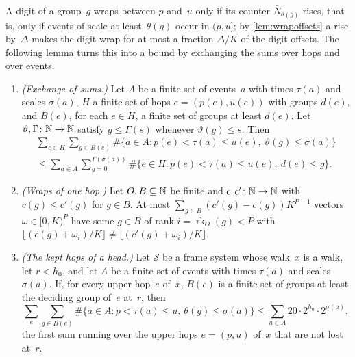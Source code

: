 A digit of a group~$g$ wraps between $p$ and~$u$ only if its counter $\bar N_{\theta(g)}$ rises, that is, only if events of scale at
least~$\theta(g)$ occur in $(p,u]$; by \cref{lem:wrapoffsets} a rise by~$\Delta$ makes the digit wrap for at most a fraction
$\Delta/K$ of the digit offsets. The following lemma turns this into a bound by exchanging the sums over hops and over events.

\begin{lemma}[Wraps]\label{lem:wraps}
\begin{enumerate}[label=(\alph*)]
\item \emph{(Exchange of sums.)} Let $A$ be a finite set of events~$a$ with times $\tau(a)$ and scales $\sigma(a)$, $H$ a finite set of
hops $e=(p(e),u(e))$ with groups $d(e)$, and $B(e)$, for each $e\in H$, a finite set of groups at least $d(e)$. Let
$\vartheta,\Gamma\colon\mathbb{N}\to\mathbb{N}$ satisfy $g\le\Gamma(s)$ whenever $\vartheta(g)\le s$. Then
\begin{multline*}
  \sum_{e\in H}\sum_{g\in B(e)}\#\{a\in A:p(e)<\tau(a)\le u(e),\ \vartheta(g)\le\sigma(a)\}\\
  \le\sum_{a\in A}\sum_{g=0}^{\Gamma(\sigma(a))}\#\{e\in H:p(e)<\tau(a)\le u(e),\ d(e)\le g\}.
\end{multline*}
\item \emph{(Wraps of one hop.)} Let $O,B\subseteq\mathbb{N}$ be finite and $c,c'\colon\mathbb{N}\to\mathbb{N}$ with $c(g)\le c'(g)$ for $g\in B$. At most
$\sum_{g\in B}(c'(g)-c(g))K^{P-1}$ vectors $\omega\in[0,K)^P$ have some $g\in B$ of rank $i=\operatorname{rk}_O(g)<P$ with
$\lfloor(c(g)+\omega_i)/K\rfloor\ne\lfloor(c'(g)+\omega_i)/K\rfloor$.
\item \emph{(The kept hops of a head.)} Let $\mathcal S$ be a frame system whose walk~$x$ is a walk, let $r<h_0$, and let $A$ be a
finite set of events with times $\tau(a)$ and scales $\sigma(a)$. If, for every upper hop~$e$ of~$x$, $B(e)$ is a finite set of
groups at least the deciding group of~$e$ at~$r$, then
\[
  \sum_{e}\sum_{g\in B(e)}\#\{a\in A:p<\tau(a)\le u,\ \theta(g)\le\sigma(a)\}\le\sum_{a\in A}20\cdot2^{h_0}\cdot2^{\sigma(a)},
\]
the first sum running over the upper hops $e=(p,u)$ of~$x$ that are not lost at~$r$.
\end{enumerate}
\end{lemma}

